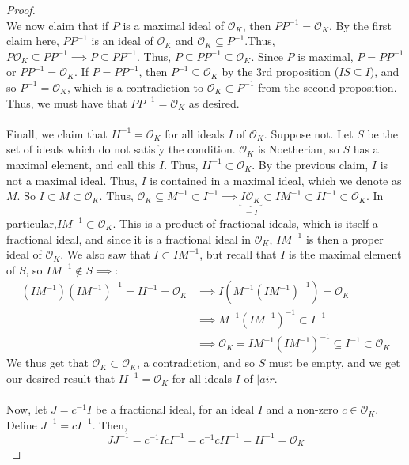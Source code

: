 \documentclass{article}
\newcommand{\air}{\mathcal{O}_K}
\begin{document}
\begin{proof}
\\
We now claim that if $P$ is a maximal ideal of $\air$, then $PP^{-1}=\air$. By the first claim here, $PP^{-1}$ is an ideal of $\air$ and $\air\subseteq P^{-1}$.Thus, $P\air\subseteq PP^{-1}\implies P\subseteq PP^{-1}$. 
Thus, $P\subseteq PP^{-1}\subseteq \air$. Since $P$ is maximal, $P=PP^{-1}$ or $PP^{-1}=\air$. 
If $P=PP^{-1}$, then $P^{-1}\subseteq \air$ by the 3rd proposition ($IS\subseteq I$), and so $P^{-1}=\air$, which is a 
contradiction to $\air\subset P^{-1}$ from the second proposition. Thus, we must have that $PP^{-1}=\air$ as desired.\\
\\
Finall, we claim that $II^{-1}=\air$ for all ideals $I$ of $\air$. Suppose not. Let $S$ be the set of ideals which do not satisfy the condition. $\air$ is Noetherian, so $S$ has a maximal element, and call this $I$. Thus, $II^{-1}\subset \air$. By the previous claim, $I$ is not a maximal ideal. Thus, $I$ is contained in a maximal ideal, which we denote as $M$. So $I\subset M\subset \air$. Thus, $\air\subseteq M^{-1}\subset I^{-1}\implies \underbrace{I\air}_{=I}\subset IM^{-1}\subset II^{-1}\subset\air$. In particular,$IM^{-1}\subset \air$. This is a product of fractional ideals, which is itself a fractional ideal, and since it is a fractional ideal in $\air$, $IM^{-1}$ is then a proper ideal of $\air$.  We also saw that $I\subset IM^{-1}$, but recall that $I$ is the maximal element of $S$, so $IM^{-1}\not\in S\implies$:
\begin{align*}
    (IM^{-1})(IM^{-1})^{-1}=II^{-1}=\air &\implies I(M^{-1}(IM^{-1})^{-1})=\air\\
    &\implies M^{-1}(IM^{-1})^{-1}\subset I^{-1}\\
    &\implies \air = IM^{-1}(IM^{-1})^{-1}\subseteq I^{-1}\subset \air
\end{align*}
We thus get that $\air\subset\air$, a contradiction, and so $S$ must be empty, and we get our desired result that $II^{-1}=\air$ for all ideals $I$ of $|air.$ \\
\\
Now, let $J=c^{-1}I$ be a fractional ideal, for an ideal $I$ and a non-zero $c\in\air$. Define $J^{-1}=cI^{-1}$. Then,
$$JJ^{-1}=c^{-1}IcI^{-1}=c^{-1}cII^{-1}=II^{-1}=\air$$
\end{proof}
\newpage
\end{document}
